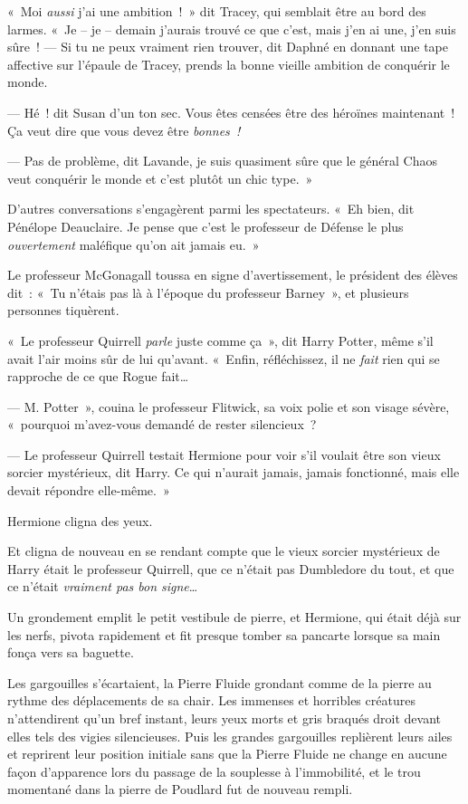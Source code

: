 «~Moi \emph{aussi} j'ai une ambition~!~» dit Tracey, qui semblait être au bord des larmes. «~Je -- je -- demain j'aurais trouvé ce que c'est, mais j'en ai une, j'en suis sûre~!
--- Si tu ne peux vraiment rien trouver, dit Daphné en donnant une tape affective sur l'épaule de Tracey, prends la bonne vieille ambition de conquérir le monde.

--- Hé~! dit Susan d'un ton sec. Vous êtes censées être des héroïnes maintenant~! Ça veut dire que vous devez être \emph{bonnes~!}

--- Pas de problème, dit Lavande, je suis quasiment sûre que le général Chaos veut conquérir le monde et c'est plutôt un chic type.~»

D'autres conversations s'engagèrent parmi les spectateurs. «~Eh bien, dit Pénélope Deauclaire. Je pense que c'est le professeur de Défense le plus \emph{ouvertement} maléfique qu'on ait jamais eu.~»

Le professeur McGonagall toussa en signe d'avertissement, le président des élèves dit~: «~Tu n'étais pas là à l'époque du professeur Barney~», et plusieurs personnes tiquèrent.

«~Le professeur Quirrell \emph{parle} juste comme ça~», dit Harry Potter, même s'il avait l'air moins sûr de lui qu'avant. «~Enfin, réfléchissez, il ne \emph{fait} rien qui se rapproche de ce que Rogue fait…

--- M. Potter~», couina le professeur Flitwick, sa voix polie et son visage sévère, «~pourquoi m'avez-vous demandé de rester silencieux~?

--- Le professeur Quirrell testait Hermione pour voir s'il voulait être son vieux sorcier mystérieux, dit Harry. Ce qui n'aurait jamais, jamais fonctionné, mais elle devait répondre elle-même.~»

Hermione cligna des yeux.

Et cligna de nouveau en se rendant compte que le vieux sorcier mystérieux de Harry était le professeur Quirrell, que ce n'était pas Dumbledore du tout, et que ce n'était \emph{vraiment pas bon signe}…

Un grondement emplit le petit vestibule de pierre, et Hermione, qui était déjà sur les nerfs, pivota rapidement et fit presque tomber sa pancarte lorsque sa main fonça vers sa baguette.

Les gargouilles s'écartaient, la Pierre Fluide grondant comme de la pierre au rythme des déplacements de sa chair. Les immenses et horribles créatures n'attendirent qu'un bref instant, leurs yeux morts et gris braqués droit devant elles tels des vigies silencieuses. Puis les grandes gargouilles replièrent leurs ailes et reprirent leur position initiale sans que la Pierre Fluide ne change en aucune façon d'apparence lors du passage de la souplesse à l'immobilité, et le trou momentané dans la pierre de Poudlard fut de nouveau rempli.

